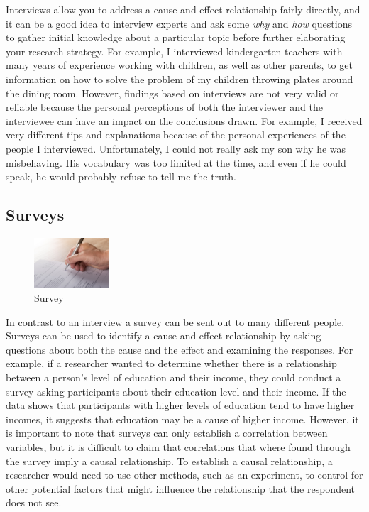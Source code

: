 \documentclass[
  12pt,
  oneside]{book}
\theoremstyle{definition}
\theoremstyle{definition}
\theoremstyle{definition}
\theoremstyle{definition}
\theoremstyle{remark}
\begin{document}
Interviews allow you to address a cause-and-effect relationship fairly directly, and it can be a good idea to interview experts and ask some \emph{why} and \emph{how} questions to gather initial knowledge about a particular topic before further elaborating your research strategy. For example, I interviewed kindergarten teachers with many years of experience working with children, as well as other parents, to get information on how to solve the problem of my children throwing plates around the dining room.
However, findings based on interviews are not very valid or reliable because the personal perceptions of both the interviewer and the interviewee can have an impact on the conclusions drawn. For example, I received very different tips and explanations because of the personal experiences of the people I interviewed. Unfortunately, I could not really ask my son why he was misbehaving. His vocabulary was too limited at the time, and even if he could speak, he would probably refuse to tell me the truth.

\hypertarget{surveys}{%
\subsection{Surveys}\label{surveys}}

\begin{figure}
\centering
\includegraphics[width=0.25\textwidth,height=\textheight]{fig/opinion-poll.jpg}
\caption[\label{fig:survey} Survey]{\label{fig:survey} Survey\footnotemark{}}
\end{figure}

In contrast to an interview a survey can be sent out to many different people. Surveys can be used to identify a cause-and-effect relationship by asking questions about both the cause and the effect and examining the responses. For example, if a researcher wanted to determine whether there is a relationship between a person's level of education and their income, they could conduct a survey asking participants about their education level and their income. If the data shows that participants with higher levels of education tend to have higher incomes, it suggests that education may be a cause of higher income. However, it is important to note that surveys can only establish a correlation between variables, but it is difficult to claim that correlations that where found through the survey imply a causal relationship. To establish a causal relationship, a researcher would need to use other methods, such as an experiment, to control for other potential factors that might influence the relationship that the respondent does not see.
\end{document}
